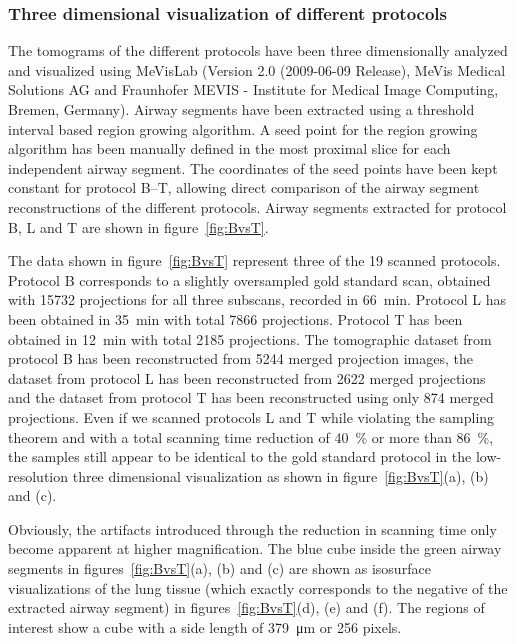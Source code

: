 \subsubsection{Three dimensional visualization of different protocols}%
\label{subsec:comparison}%
The tomograms of the different protocols have been three dimensionally analyzed and visualized using MeVisLab (Version 2.0 (2009-06-09 Release), MeVis Medical Solutions AG and Fraunhofer MEVIS - Institute for Medical Image Computing, Bremen, Germany). Airway segments have been extracted using a threshold interval based region growing algorithm. A seed point for the region growing algorithm has been manually defined in the most proximal slice for each independent airway segment. The coordinates of the seed points have been kept constant for protocol B--T, allowing direct comparison of the airway segment reconstructions of the different protocols. Airway segments extracted for protocol B, L and T are shown in figure~\ref{fig:BvsT}.

The data shown in figure~\ref{fig:BvsT} represent three of the 19 scanned protocols. Protocol B corresponds to a slightly oversampled gold standard scan, obtained with 15732 projections for all three subscans, recorded in \SI{66}{\minute}. Protocol L has been obtained in \SI{35}{\minute} with total 7866 projections. Protocol T has been obtained in \SI{12}{\minute} with total 2185 projections. The tomographic dataset from protocol B has been reconstructed from 5244 merged projection images, the dataset from protocol L has been reconstructed from 2622 merged projections and the dataset from protocol T has been reconstructed using only 874 merged projections. Even if we scanned protocols L and T while violating the sampling theorem and with a total scanning time reduction of \SI{40}{\percent} or more than \SI{86}{\percent}, the samples still appear to be identical to the gold standard protocol in the low-resolution three dimensional visualization as shown in figure~\ref{fig:BvsT}(a), (b) and (c).

Obviously, the artifacts introduced through the reduction in scanning time only become apparent at higher magnification. The blue cube inside the green airway segments in figures~\ref{fig:BvsT}(a), (b) and (c) are shown as isosurface visualizations of the lung tissue (which exactly corresponds to the negative of the extracted airway segment) in figures~\ref{fig:BvsT}(d), (e) and (f). The regions of interest show a cube with a side length of \SI{379}{\micro\meter} or 256 pixels.


